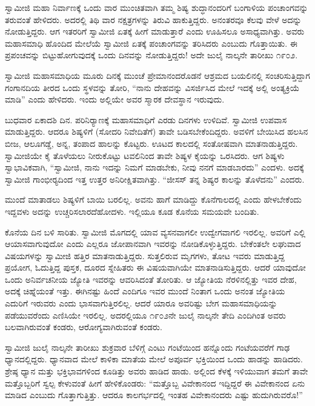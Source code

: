  ಸ್ವಾಮೀಜಿ ಮಹಾ ನಿರ್ವಾಣಕ್ಕೆ ಒಂದು ವಾರ ಮುಂಚಿತವಾಗಿ ತಮ್ಮ ಶಿಷ್ಯ ಶುದ್ಧಾನಂದರಿಗೆ ಬಂಗಾಳಿಯ ಪಂಚಾಂಗವನ್ನು ತರುವಂತೆ ಹೇಳಿದರು. ಅದರಲ್ಲಿ ತಿಥಿ ವಾರ ನಕ್ಷತ್ರಗಳನ್ನು ತಿರುವಿ ಹಾಕುತ್ತಿದ್ದರು. ಅನಂತರವೂ ಕೆಲವು ವೇಳೆ ಅದನ್ನು ನೋಡುತ್ತಿದ್ದರು. ಆಗ ಇತರರಿಗೆ ಸ್ವಾಮೀಜಿ ಏತಕ್ಕೆ ಹೀಗೆ ಮಾಡುತ್ತಾರೆ ಎಂದು ಊಹಿಸಲೂ ಅಸಾಧ್ಯವಾಗಿತ್ತು. ಅವರು ಮಹಾಸಮಾಧಿ ಹೊಂದಿದ ಮೇಲೆಯೆ ಸ್ವಾಮೀಜಿ ಏತಕ್ಕೆ ಪಂಚಾಂಗವನ್ನು ತರಿಸಿದರು ಎಂಬುದು ಗೊತ್ತಾಯಿತು. ಈ ಪ್ರಪಂಚವನ್ನು ಬಿಟ್ಟುಹೋಗುವುದಕ್ಕೆ ಒಂದು ದಿನವನ್ನು ನೋಡುತ್ತಿದ್ದರು! ಅದೇ ಜುಲೈ ನಾಲ್ಕನೇ ತಾರೀಖು ೧೯೦೨. 

 ಸ್ವಾಮೀಜಿ ಮಹಾಸಮಾಧಿಯ ಮೂರು ದಿನಕ್ಕೆ ಮುಂಚೆ ಪ್ರೇಮಾನಂದರೊಡನೆ ಆಶ್ರಮದ ಬಯಲಿನಲ್ಲಿ ಸಂಚರಿಸುತ್ತಿದ್ದಾಗ ಗಂಗಾನದಿಯ ತೀರದ ಒಂದು ಸ್ಥಳವನ್ನು ತೋರಿ, “ನಾನು ದೇಹವನ್ನು ವಿಸರ್ಜಿಸಿದ ಮೇಲೆ ಇದಕ್ಕೆ ಅಲ್ಲಿ ಅಂತ್ಯಕ್ರಿಯೆ ಮಾಡಿ” ಎಂದು ಹೇಳಿದರು. ಇಂದು ಅಲ್ಲಿಯೇ ಅವರ ಸ್ಮಾರಕ ದೇವಸ್ಥಾನ ಇರುವುದು. 

 ಬುಧವಾರ ಏಕಾದಶಿ ದಿನ. ಪರಿನಿರ‍್ಯಾಣಕ್ಕೆ ಮಹಾಸಮಾಧಿಗೆ ಎರಡು ದಿನಗಳು ಉಳಿದಿವೆ. ಸ್ವಾಮೀಜಿ ಉಪವಾಸ ಮಾಡುತ್ತಿದ್ದರು. ಆದರೂ ಶಿಷ್ಯಳಿಗೆ (ಸೋದರಿ ನಿವೇದಿತೆಗೆ) ತಾವೇ ಬಡಿಸಬೇಕೆಂದಿದ್ದರು. ಅವಳಿಗೆ ಬೇಯಿಸಿದ ಹಲಸಿನ ಬೀಜ, ಆಲೂಗಡ್ಡೆ, ಅನ್ನ, ತಂಪಾದ ಹಾಲನ್ನು ಕೊಟ್ಟರು. ಊಟದ ಕಾಲದಲ್ಲಿ ಸಂತೋಷವಾಗಿ ಮಾತನಾಡುತ್ತಿದ್ದರು. ಸ್ವಾಮೀಜಿಯೇ ಕೈ ತೊಳೆಯಲು ನೀರುಕೊಟ್ಟು ಟವಲಿನಿಂದ ತಾವೇ ಶಿಷ್ಯಳ ಕೈಯನ್ನು ಒರಸಿದರು. ಆಗ ಶಿಷ್ಯಳು ಸ್ವಾಭಾವಿಕವಾಗಿ, “ಸ್ವಾಮೀಜಿ, ನಾನು ಇದನ್ನು ನಿಮಗೆ ಮಾಡಬೇಕು, ನೀವು ನನಗೆ ಮಾಡಬಾರದು” ಎಂದಳು. ಅದಕ್ಕೆ ಸ್ವಾಮೀಜಿ ಗಾಂಭೀರ‍್ಯದಿಂದ ಇತ್ತ ಉತ್ತರ ಅನಿರೀಕ್ಷಿತವಾಗಿತ್ತು. “ಜೀಸಸ್ ತನ್ನ ಶಿಷ್ಯರ ಕಾಲನ್ನು ತೊಳೆದನು” ಎಂದರು. 

 ಮುಂದೆ ಮಾತಾಡಲು ಶಿಷ್ಯಳಿಗೆ ಬಾಯಿ ಬರಲಿಲ್ಲ. ಅವನು ಹಾಗೆ ಮಾಡಿದ್ದು ಕೊನೆಗಾಲದಲ್ಲಿ ಎಂದು ಹೇಳಬೇಕೆಂದು ಇದ್ದವಳು ಅದನ್ನು ಉಚ್ಚರಿಸಲಾರದೆ\break ಹೋದಳು. ಇಲ್ಲಿಯೂ ಕೂಡ ಕೊನೆಯ ಸಮಯವೇ ಬಂದಿತು. 

 ಕೊನೆಯ ದಿನ ಬಳಿ ಸಾರಿತು. ಸ್ವಾಮೀಜಿ ಮೊಗದಲ್ಲಿ ಯಾವ ವ್ಯಸನವಾಗಲೀ ಉದ್ವೇಗವಾಗಲಿ ಇರಲಿಲ್ಲ. ಅವರಿಗೆ ಎಲ್ಲಿ ಆಯಾಸವಾಗುವುದೋ ಎಂದು ಎಲ್ಲರೂ ಜೋಪಾನವಾಗಿ ಇವರನ್ನು ನೋಡಿಕೊಳ್ಳುತ್ತಿದ್ದರು. ಬೇಕೆಂತಲೇ ಲಘುವಾದ ವಿಷಯಗಳನ್ನು ಸ್ವಾಮೀಜಿ ಹತ್ತಿರ ಮಾತನಾಡುತ್ತಿದ್ದರು. ಸುತ್ತಲಿರುವ ಮೃಗಗಳು, ತೋಟ ಇವರು ಮಾಡುತ್ತಿದ್ದ ಪ್ರಯೋಗ, ಓದುತ್ತಿದ್ದ ಪುಸ್ತಕ, ದೂರದ ಸ್ನೇಹಿತರು ಈ ವಿಷಯವಾಗಿಯೇ ಮಾತನಾಡಿಸುತ್ತಿದ್ದರು. ಆದರೆ ಯಾವುದೋ ಒಂದು ಅನಿರ್ವಚನೀಯ ಜ್ಯೋತಿ ಇವರನ್ನು ಆವರಿಸಿದಂತೆ ತೋರಿತು. ಆ ಜ್ಯೋತಿಯ ನೆರಳಿನಲ್ಲಿತ್ತು ಇವರ ದೇಹ, ಅದಕ್ಕೆ ಚಿಹ್ನೆಯಂತೆ ಇತ್ತು. ಈಗಿನಷ್ಟು ಹಿಂದೆ ಎಂದಿಗೂ ಇವರ ಮುಂದೆ ನಿಂತಾಗ ಒಂದು ಅನಂತ ಜ್ಯೋತಿಯ ಎದುರಿಗೆ ಇರುವರು ಎಂದು ಭಾಸವಾಗುತ್ತಿರಲಿಲ್ಲ. ಆದರೆ ಯಾರೂ ಅವರಿಷ್ಟು ಬೇಗ ಮಹಾಸಮಾಧಿಯನ್ನು ಪಡೆಯುವರೆಂದು ಎಣಿಸಿಯೇ ಇರಲಿಲ್ಲ. ಅದರಲ್ಲಿಯೂ ೧೯೦೨ನೇ ಜುಲೈ ನಾಲ್ಕನೇ ತೇದಿ ಎಂದಿಗಿಂತ ಅವರು ಬಲವಾಗಿರುವಂತೆ ಕಂಡರು, ಆರೋಗ್ಯವಾಗಿರುವಂತೆ ಕಂಡರು. 

 ಸ್ವಾಮೀಜಿ ಜುಲೈ ನಾಲ್ಕನೇ ತಾರೀಖು ಶುಕ್ರವಾರ ಬೆಳಿಗ್ಗೆ ಎಂಟು ಗಂಟೆಯಿಂದ ಹನ್ನೊಂದು ಗಂಟೆಯವರೆಗೆ ಗಾಢ ಧ್ಯಾನದಲ್ಲಿದ್ದರು. ಧ್ಯಾನವಾದ ಮೇಲೆ ಕಾಳಿಕಾ ಮಾತೆಯ ಮೇಲೆ ಅಪೂರ್ವ ಭಕ್ತಿಯಿಂದ ಒಂದು ಹಾಡನ್ನು ಹಾಡಿದರು. ಶ್ರೇಷ್ಠ ಧ್ಯಾನ ಮತ್ತು ಭಕ್ತಿಭಾವಗಳಿಂದ ಕೂಡಿತ್ತು ಅವರು ಹಾಡಿದ ಹಾಡು. ಅಲ್ಲಿಂದ ಕೆಳಕ್ಕೆ ಇಳಿಯುವಾಗ ತಮಗೆ ತಾವೇ ಮತ್ತೊಬ್ಬರಿಗೆ ಸ್ವಲ್ಪ ಕೇಳುವಂತೆ ಹೀಗೆ ಹೇಳಿಕೊಂಡರು: “ಮತ್ತೊಬ್ಬ ವಿವೇಕಾನಂದ ಇದ್ದಿದ್ದರೆ ಈ ವಿವೇಕಾನಂದ ಏನು ಮಾಡಿದ ಎಂಬುದು ಗೊತ್ತಾಗುತ್ತಿತ್ತು. ಆದರೂ ಕಾಲಗರ್ಭದಲ್ಲಿ ಇಂತಹ ವಿವೇಕಾನಂದರು ಎಷ್ಟು ಹುದುಗಿರುವರೊ!” 


